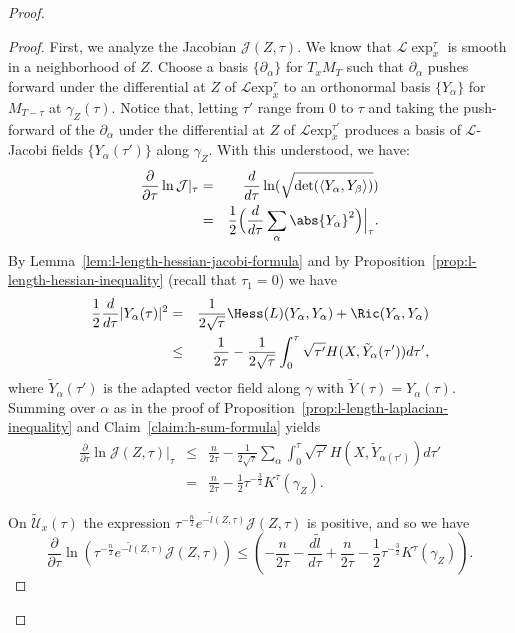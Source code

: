 \begin{proof}
\begin{proof}
 First, we analyze the Jacobian
${\mathcal J}(Z,\tau)$. We know that $\mathcal{L}\exp_x^{\tau}$
is smooth in a neighborhood of $Z$. Choose a basis
$\{\partial_\alpha\}$ for $T_xM_T$ such that $\partial_\alpha$
pushes forward under the differential at $Z$ of ${\mathcal L}\mathrm{exp}_x^\tau$  to an orthonormal basis $\{Y_\alpha\}$ for
$M_{T-\tau}$ at $\gamma_Z(\tau)$. Notice that, letting $\tau'$ range
from $0$ to $\tau$ and taking the push-forward of the
$\partial_\alpha$ under the differential at $Z$ of ${\mathcal L}\mathrm{exp}_x^{\tau'}$ produces a basis of ${\mathcal L}$-Jacobi fields
$\{Y_\alpha(\tau')\}$ along $\gamma_Z$. With this understood, we
have:
\begin{eqnarray*}
\frac{\partial}{\partial \tau}\ln\mathcal{J}|_\tau & = &
\frac{d}{d\tau}\ln(\sqrt{\det(\langle
Y_{\alpha},Y_{\beta}\rangle
)})\\
 & = &
\frac{1}{2}\Bigl(\frac{d}{d\tau}\sum_{\alpha}\abs{Y_{\alpha}}^{2}\Bigr)\Bigl|_{\tau}\Bigr.
.
\end{eqnarray*}
By Lemma~\ref{lem:l-length-hessian-jacobi-formula} and by Proposition~\ref{prop:l-length-hessian-inequality} (recall that
$\tau_1=0$) we have
\begin{eqnarray}\nonumber
\frac{1}{2}\frac{d}{d\tau}|Y_\alpha(\tau)|^2 & = &
\frac{1}{2\sqrt{\tau}}\Hess(L)(Y_\alpha,Y_\alpha) +\Ric(Y_\alpha,Y_\alpha) \\ & \le &
\frac{1}{2\tau}-\frac{1}{2\sqrt{\tau}}\int_0^{\tau}\sqrt{\tau'}H(X,\tilde
Y_\alpha(\tau'))d\tau',\label{basic}\end{eqnarray} where $\tilde
Y_\alpha(\tau')$ is the adapted vector field along $\gamma$ with
$\tilde Y(\tau)=Y_\alpha(\tau)$. Summing over $\alpha$ as in the
proof of Proposition~\ref{prop:l-length-laplacian-inequality} and Claim~\ref{claim:h-sum-formula} yields
\begin{eqnarray}
\frac{\partial}{\partial\tau}\ln\mathcal{J}(Z,\tau)|_{\tau} &
\le & \frac{n}{2\tau} -
\frac{1}{2\sqrt{\tau}}\sum_{\alpha}\int_{0}^{\tau}\sqrt{\tau'}H(X,\tilde
Y_{\alpha(\tau')})d\tau' \nonumber
\\&=  & \frac{n}{2\tau} - \frac{1}{2}\tau^{-\frac{3}{2}}K^\tau(\gamma_Z).\label{Jinequ}
\end{eqnarray}

On $\widetilde {\mathcal U}_x(\tau)$ the expression
$\tau^{-\frac{n}{2}}e^{-\widetilde l(Z,\tau)}{\mathcal J}(Z,\tau)$
is positive, and so we have
$$\frac{\partial}{\partial\tau}\ln\left(\tau^{-\frac{n}{2}}e^{-\widetilde
l(Z,\tau)}{\mathcal J}(Z,\tau)\right)\le
\left(-\frac{n}{2\tau}-\frac{d\widetilde l}{d
\tau}+\frac{n}{2\tau}-\frac{1}{2}\tau^{-\frac{3}{2}}K^\tau(\gamma_Z)\right).$$



\end{proof}
\end{proof}
